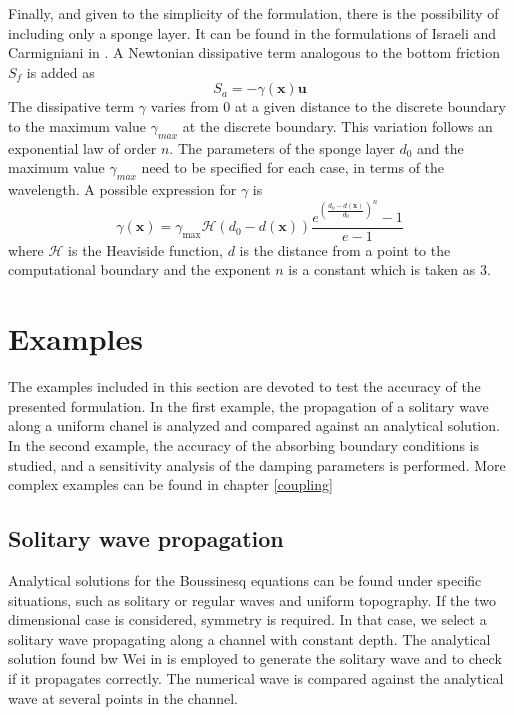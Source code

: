 Finally, and given to the simplicity of the formulation, there is the possibility of including only a sponge layer. It can be found in the formulations of Israeli and Carmigniani in \cite{israeli1981,carmigniani2018}. A Newtonian dissipative term analogous to the bottom friction $S_f$ is added as
\begin{equation}
    S_a = -\gamma(\mathbf{x}) \mathbf{u}
\end{equation}
The dissipative term $\gamma$ varies from 0 at a given distance to the discrete boundary to the maximum value $\gamma_{max}$ at the discrete boundary. This variation follows an exponential law \cite{peric2018} of order $n$. The parameters of the sponge layer $d_0$ and the maximum value $\gamma_{max}$ need to be specified for each case, in terms of the wavelength.
A possible expression for $\gamma$ is
\begin{equation} \label{exponential_sponge_layer}
    \gamma(\mathbf{x}) = \gamma_{\max} \mathcal{H}(d_0 - d(\mathbf{x})) \frac{e^{\left(\frac{d_0 - d(\mathbf{x})}{d_0}\right)^n} - 1}{e - 1}
\end{equation}
where $\mathcal{H}$ is the Heaviside function, $d$ is the distance from a point to the computational boundary and the exponent $n$ is a constant which is taken as 3.




\section{Examples}


The examples included in this section are devoted to test the accuracy of the presented formulation. In the first example, the propagation of a solitary wave along a uniform chanel is analyzed and compared against an analytical solution. In the second example, the accuracy of the absorbing boundary conditions is studied, and a sensitivity analysis of the damping parameters is performed. More complex examples can be found in chapter \ref{coupling} 


\subsection{Solitary wave propagation}


Analytical solutions for the Boussinesq equations can be found under specific situations, such as solitary or regular waves and uniform topography. If the two dimensional case is considered, symmetry is required. In that case, we select a solitary wave propagating along a channel with constant depth. The analytical solution found bw Wei in \cite{wei1995} is employed to generate the solitary wave and to check if it propagates correctly. The numerical wave is compared against the analytical wave at several points in the channel.


